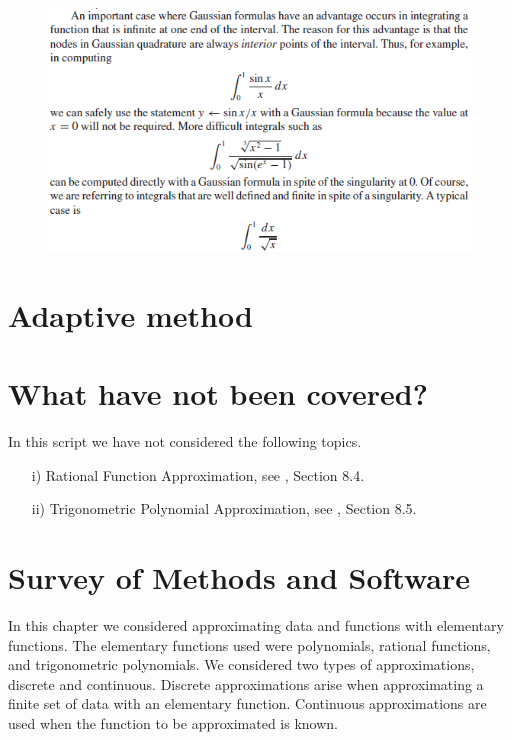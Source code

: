 \documentclass[12pt]{article}
\theoremstyle{theorem}
\begin{document}
\begin{figure}[h!]
	\centering
	\includegraphics[scale=1.1]{Figures/49}
	\label{fig:49}
\end{figure}

\cleardoublepage
\section{Adaptive method}

\cleardoublepage
\section{What have not been covered?}

\begin{shaded}
In this script we have not considered the following topics.
\begin{enumerate}
 \item[i)] Rational Function Approximation, see \cite{BurF10}, Section 8.4. 
 \item[ii)] Trigonometric Polynomial Approximation, see \cite{BurF10}, Section 8.5. 
\end{enumerate}
\end{shaded}

\section{Survey of Methods and Software}
In this chapter we considered approximating data and functions with elementary functions.
The elementary functions used were polynomials, rational functions, and trigonometric
polynomials. We considered two types of approximations, discrete and continuous. Discrete
approximations arise when approximating a finite set of data with an elementary
function. Continuous approximations are used when the function to be approximated is
known.
\end{document}
